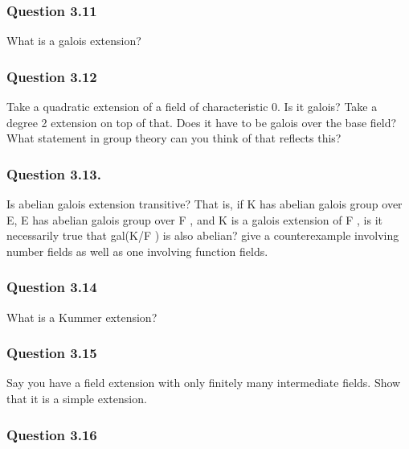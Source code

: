 \hypertarget{question-3.11}{%
\subsubsection{Question 3.11}\label{question-3.11}}

What is a galois extension?

\hypertarget{question-3.12}{%
\subsubsection{Question 3.12}\label{question-3.12}}

Take a quadratic extension of a field of characteristic 0. Is it galois?
Take a degree 2 extension on top of that. Does it have to be galois over
the base field? What statement in group theory can you think of that
reﬂects this?

\hypertarget{question-3.13.}{%
\subsubsection{Question 3.13.}\label{question-3.13.}}

Is abelian galois extension transitive? That is, if K has abelian galois
group over E, E has abelian galois group over F , and K is a galois
extension of F , is it necessarily true that gal(K/F ) is also abelian?
give a counterexample involving number fields as well as one involving
function fields.

\hypertarget{question-3.14}{%
\subsubsection{Question 3.14}\label{question-3.14}}

What is a Kummer extension?

\hypertarget{question-3.15}{%
\subsubsection{Question 3.15}\label{question-3.15}}

Say you have a field extension with only finitely many intermediate
fields. Show that it is a simple extension.

\hypertarget{question-3.16}{%
\subsubsection{Question 3.16}\label{question-3.16}}

